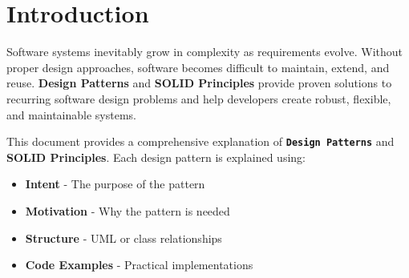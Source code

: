\documentclass[12pt,a4paper]{article}
\newcommand{\important}[1]{\textbf{\textcolor{accent}{#1}}}
\newcommand{\keyword}[1]{\textbf{\textcolor{codeblue}{#1}}}
\newcommand{\pattern}[1]{\textbf{\textcolor{secondary}{\texttt{#1}}}}
\newcommand{\principle}[1]{\textbf{\textcolor{primary}{#1}}}
\begin{document}
\begin{titlepage}
    
\end{titlepage}

\tableofcontents
\newpage

\section{Introduction}
\label{sec:introduction}


\vspace{1cm}

Software systems inevitably grow in complexity as requirements evolve. Without proper design approaches, software becomes difficult to maintain, extend, and reuse. \important{Design Patterns} and \important{SOLID Principles} provide proven solutions to recurring software design problems and help developers create robust, flexible, and maintainable systems.

This document provides a comprehensive explanation of \pattern{Design Patterns} and \principle{SOLID Principles}. Each design pattern is explained using:
\begin{itemize}[leftmargin=*]
    \item \keyword{Intent} - The purpose of the pattern
    \item \keyword{Motivation} - Why the pattern is needed
    \item \keyword{Structure} - UML or class relationships
    \item \keyword{Code Examples} - Practical implementations
\end{itemize}
\end{document}

